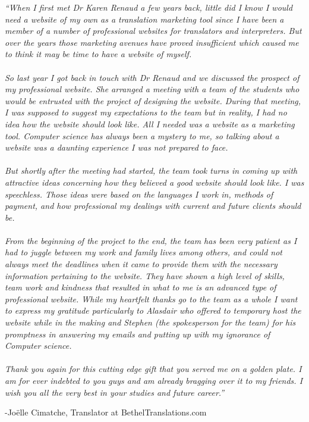 \documentclass{l3proj}
\begin{document}
\textit{``When I first met Dr Karen Renaud a few years back, little did I know I
would need a website of my own as a translation marketing tool since I have been
a member of a number of professional websites for translators and interpreters.
But over the years those marketing avenues have proved insufficient which caused
me to think it may be time to have a website of myself.\\
\\
So last year I got back in touch with Dr Renaud and we discussed the prospect of
my professional website. She arranged a meeting with a team of the students who
would be entrusted with the project of designing the website.
During that meeting, I was supposed to suggest my expectations to the team but
in reality, I had no idea how the website should look like. All I needed was a
website as a marketing tool. Computer science has always been a mystery to me,
so talking about a website was a daunting experience I was not prepared to
face.\\
\\
But shortly after the meeting had started, the team took turns in coming up with
attractive ideas concerning how they believed a good website should look like. I
was speechless. Those ideas were based on the languages I work in, methods of
payment, and how professional my dealings with current and future clients should
be.\\
\\
From the beginning of the project to the end, the team has been very patient as
I had to juggle between my work and family lives among others, and could not
always meet the deadlines when it came to provide them with the necessary
information pertaining to the website.
They have shown a high level of skills, team work and kindness that resulted in
what to me is an advanced type of professional website.
While my heartfelt thanks go to the team as a whole I want to express my
gratitude particularly to Alasdair who offered to temporary host the website
while in the making and Stephen (the spokesperson for the team) for his
promptness in answering my emails and putting up with my ignorance of Computer
science.\\
\\
Thank you again for this cutting edge gift that you served me on a golden plate.
I am for ever indebted to you guys and am already bragging over it to my
friends. I wish you all the very best in your studies and future career.''}
\begin{flushright}
-Jo\"{e}lle Cimatche, Translator at BethelTranslations.com
\end{flushright}
\newpage
\end{document}
